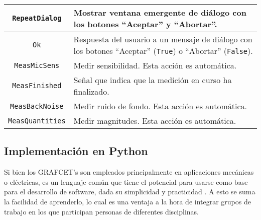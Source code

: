 \begin{table}[!h]
\begin{tabularx}{\textwidth}{c|X}
        {\tiny\texttt{RepeatDialog}}           & Mostrar ventana emergente de diálogo con los botones ``Aceptar'' y ``Abortar''. \\ \hline
        {\tiny\texttt{Ok}} & Respuesta del usuario a un mensaje de diálogo con los botones ``Aceptar'' ({\tiny\texttt{True}})
        o ``Abortar'' ({\tiny\texttt{False}}). \\ \hline
        {\tiny\texttt{MeasMicSens}}            & Medir sensibilidad.
        Esta acción es automática.                                  \\ \hline
        {\tiny\texttt{MeasFinished}}           & Señal que indica que la medición en curso ha finalizado.                        \\ \hline
        {\tiny\texttt{MeasBackNoise}}          & Medir ruido de fondo.
        Esta acción es automática.                                \\ \hline
        {\tiny\texttt{MeasQuantities}}         & Medir magnitudes.
        Esta acción es automática.
    \end{tabularx}
\end{table}

\vfill
\clearpage

\subsection{Implementación en Python}
Si bien los GRAFCET's son empleados principalmente en aplicaciones mecánicas o eléctricas, es un lenguaje común que tiene el potencial para usarse como base para el desarrollo de software, dada su simplicidad y practicidad . A esto se suma la facilidad de aprenderlo, lo cual es una ventaja a la hora de integrar grupos de trabajo en los que participan personas de diferentes disciplinas.

